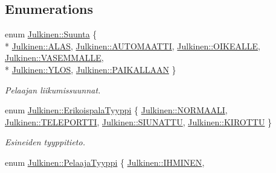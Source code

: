 \subsection*{Enumerations}
\begin{DoxyCompactItemize}
\item 
enum \hyperlink{namespace_julkinen_a81b50e3c6f21c0c1c46e186592107c3c}{Julkinen\+::\+Suunta} \{ \\*
\hyperlink{namespace_julkinen_a81b50e3c6f21c0c1c46e186592107c3cacae80e18deb2f6685d0bf0f174042ec2}{Julkinen\+::\+A\+L\+A\+S}, 
\hyperlink{namespace_julkinen_a81b50e3c6f21c0c1c46e186592107c3ca989d727d65ca4aea941b51638e642596}{Julkinen\+::\+A\+U\+T\+O\+M\+A\+A\+T\+T\+I}, 
\hyperlink{namespace_julkinen_a81b50e3c6f21c0c1c46e186592107c3cafd8f13dddbcf5e33a9c33a4cdae76f59}{Julkinen\+::\+O\+I\+K\+E\+A\+L\+L\+E}, 
\hyperlink{namespace_julkinen_a81b50e3c6f21c0c1c46e186592107c3ca4b3b91fdb43fdb60e03fb47b23c78e03}{Julkinen\+::\+V\+A\+S\+E\+M\+M\+A\+L\+L\+E}, 
\\*
\hyperlink{namespace_julkinen_a81b50e3c6f21c0c1c46e186592107c3caa9a06721d0cc8ff51b1071d3962841ee}{Julkinen\+::\+Y\+L\+O\+S}, 
\hyperlink{namespace_julkinen_a81b50e3c6f21c0c1c46e186592107c3cafa60a1b03bc49af14fb90b7026f94957}{Julkinen\+::\+P\+A\+I\+K\+A\+L\+L\+A\+A\+N}
 \}\begin{DoxyCompactList}\small\item\em Pelaajan liikumissuunnat. \end{DoxyCompactList}
\item 
enum \hyperlink{namespace_julkinen_afc26052e09d0b2214f749492cc5fff19}{Julkinen\+::\+Erikoispala\+Tyyppi} \{ \hyperlink{namespace_julkinen_afc26052e09d0b2214f749492cc5fff19a67d9c76baa2a4eec4ca132c15bd567b5}{Julkinen\+::\+N\+O\+R\+M\+A\+A\+L\+I}, 
\hyperlink{namespace_julkinen_afc26052e09d0b2214f749492cc5fff19aec227daa1859a2163571035e354c97b4}{Julkinen\+::\+T\+E\+L\+E\+P\+O\+R\+T\+T\+I}, 
\hyperlink{namespace_julkinen_afc26052e09d0b2214f749492cc5fff19aa50081048583c91c88ed285cad5d3080}{Julkinen\+::\+S\+I\+U\+N\+A\+T\+T\+U}, 
\hyperlink{namespace_julkinen_afc26052e09d0b2214f749492cc5fff19a8a097f13eb73d7bf4d8cd14dea73ce24}{Julkinen\+::\+K\+I\+R\+O\+T\+T\+U}
 \}\begin{DoxyCompactList}\small\item\em Esineiden tyyppitieto. \end{DoxyCompactList}
\item 
enum \hyperlink{namespace_julkinen_ad9a0a9e01af78249f584a93b03db4329}{Julkinen\+::\+Pelaaja\+Tyyppi} \{ \hyperlink{namespace_julkinen_ad9a0a9e01af78249f584a93b03db4329ac071c9196447e9db07e03619140a21a9}{Julkinen\+::\+I\+H\+M\+I\+N\+E\+N}, 

\end{DoxyCompactItemize}
